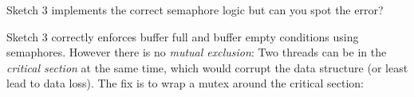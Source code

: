 Sketch 3 implements the correct semaphore logic but can you spot the
error?

\begin{Shaded}
\begin{Highlighting}[]
 
   
   
\NormalTok{\}}

  
\NormalTok{\}}
\end{Highlighting}
\end{Shaded}

Sketch 3 correctly enforces buffer full and buffer empty conditions
using semaphores. However there is no \emph{mutual exclusion}: Two
threads can be in the \emph{critical section} at the same time, which
would corrupt the data structure (or least lead to data loss). The fix
is to wrap a mutex around the critical section:

